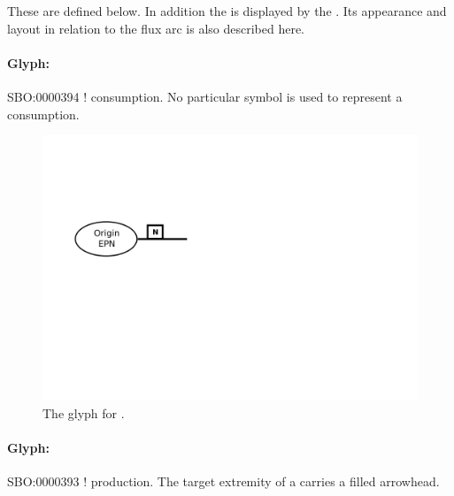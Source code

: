 These are defined below. In addition the  is
displayed by the . Its appearance and
layout in relation to the flux arc is also described here.

\paragraph{Glyph: }
\label{sec:techref:consumption}

\begin{glyphDescription}
 \glyphSboTerm SBO:0000394 ! consumption.
 \glyphEndPoint No particular symbol is used to represent a consumption.
\end{glyphDescription}


\begin{figure}[htb]
  \centering
  \includegraphics[scale = 0.4]{images/consumption}
  \caption{The \PD glyph for .}
  \label{fig:techref:consumption}
\end{figure}

\paragraph{Glyph: }\label{sec:techref:production}

\begin{glyphDescription}
 \glyphSboTerm SBO:0000393 ! production.
 \glyphEndPoint The target extremity of a  carries a filled arrowhead.
 \end{glyphDescription}

